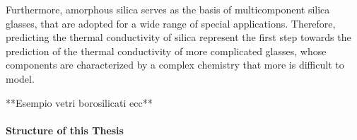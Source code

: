 Furthermore, amorphous silica serves as the basis of multicomponent silica glasses, that are adopted for a wide range of special applications. 
Therefore, predicting the thermal conductivity of silica represent the first step towards the prediction of the thermal conductivity of more complicated glasses, whose components are characterized by a complex chemistry that more is difficult to model.

**Esempio vetri borosilicati ecc**





\bigskip
\paragraph{Structure of this Thesis}
